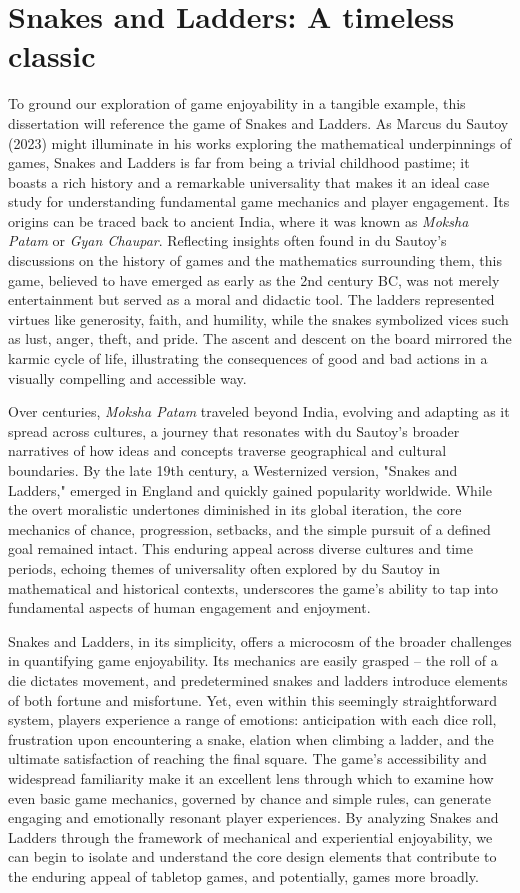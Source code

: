 \documentclass[12pt]{report}
\begin{document}
	\section{Snakes and Ladders: A timeless classic}
	To ground our exploration of game enjoyability in a tangible example, this dissertation will reference the game of Snakes and Ladders. As Marcus du Sautoy (2023) might illuminate in his works exploring the mathematical underpinnings of games, Snakes and Ladders is far from being a trivial childhood pastime; it boasts a rich history and a remarkable universality that makes it an ideal case study for understanding fundamental game mechanics and player engagement.  Its origins can be traced back to ancient India, where it was known as \textit{Moksha Patam} or \textit{Gyan Chaupar}.  Reflecting insights often found in du Sautoy's discussions on the history of games and the mathematics surrounding them, this game, believed to have emerged as early as the 2nd century BC, was not merely entertainment but served as a moral and didactic tool. The ladders represented virtues like generosity, faith, and humility, while the snakes symbolized vices such as lust, anger, theft, and pride.  The ascent and descent on the board mirrored the karmic cycle of life, illustrating the consequences of good and bad actions in a visually compelling and accessible way.
	
	Over centuries, \textit{Moksha Patam} traveled beyond India, evolving and adapting as it spread across cultures, a journey that resonates with du Sautoy's broader narratives of how ideas and concepts traverse geographical and cultural boundaries. By the late 19th century, a Westernized version, "Snakes and Ladders," emerged in England and quickly gained popularity worldwide. While the overt moralistic undertones diminished in its global iteration, the core mechanics of chance, progression, setbacks, and the simple pursuit of a defined goal remained intact.  This enduring appeal across diverse cultures and time periods, echoing themes of universality often explored by du Sautoy in mathematical and historical contexts, underscores the game's ability to tap into fundamental aspects of human engagement and enjoyment.
	
	Snakes and Ladders, in its simplicity, offers a microcosm of the broader challenges in quantifying game enjoyability.  Its mechanics are easily grasped – the roll of a die dictates movement, and predetermined snakes and ladders introduce elements of both fortune and misfortune.  Yet, even within this seemingly straightforward system, players experience a range of emotions: anticipation with each dice roll, frustration upon encountering a snake, elation when climbing a ladder, and the ultimate satisfaction of reaching the final square.  The game’s accessibility and widespread familiarity make it an excellent lens through which to examine how even basic game mechanics, governed by chance and simple rules, can generate engaging and emotionally resonant player experiences. By analyzing Snakes and Ladders through the framework of mechanical and experiential enjoyability, we can begin to isolate and understand the core design elements that contribute to the enduring appeal of tabletop games, and potentially, games more broadly.
	
	
\end{document}
